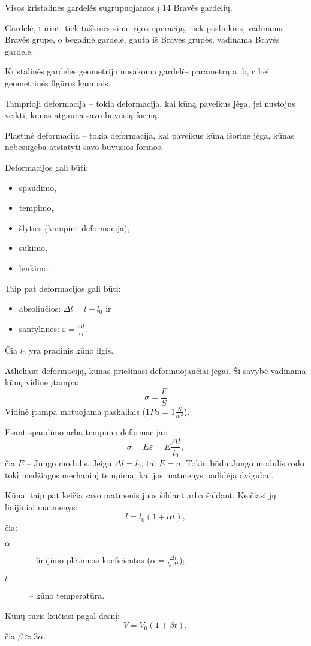 Visos kristalinės gardelės sugrupuojamos į 14 Bravės gardelių.

Gardelė, turinti tiek taškinės simetrijos operaciją, tiek poslinkius,
vadinama Bravės grupe, o begalinė gardelė, gauta iš Bravės grupės,
vadinama Bravės gardele.

Kristalinės gardelės geometrija nusakoma gardelės parametrų a, b, c
bei geometrinės figūros kampais.

Tamprioji deformacija – tokia deformacija, kai kūną paveikus jėga, jei
nustojus veikti, kūnas atgauna savo buvusią formą.

Plastinė deformacija – tokia deformacija, kai paveikus kūną išorine jėga,
kūnas nebesugeba atstatyti savo buvusios formos.

Deformacijos gali būti:
\begin{itemize}
  \item spaudimo,
  \item tempimo,
  \item šlyties (kampinė deformacija),
  \item sukimo,
  \item lenkimo.
\end{itemize}

Taip pat deformacijos gali būti:
\begin{itemize}
  \item absoliučios: $\Delta l = l - l_{0}$ ir
  \item santykinės: $\varepsilon = \frac{\Delta l}{l_{0}}$.
\end{itemize}
Čia $l_{0}$ yra pradinis kūno ilgis.

Atliekant deformaciją, kūnas priešinasi deformuojančiai jėgai. Ši
savybė vadinama kūnų vidine įtampa:
\begin{equation*}
  \sigma = \frac{F}{S}
\end{equation*}
Vidinė įtampa matuojama paskaliais ($1 Pa = 1 \frac{N}{m^{2}}$).

Esant spaudimo arba tempimo deformacijai:
\begin{equation*}
  \sigma = E \varepsilon = E \frac{\Delta l}{l_{0}},
\end{equation*}
čia $E$ – Jungo modulis. Jeigu $\Delta l = l_{0}$, tai $E = \sigma$.
Tokiu būdu Jungo modulis rodo tokį medžiagos mechaninį tempimą, kai
jos matmenys padidėja dvigubai.

Kūnai taip pat keičia savo matmenis juos šildant arba šaldant. Keičiasi
jų linijiniai matmenys:
\begin{equation*}
  l = l_{0}(1 + \alpha t),
\end{equation*}
čia:
\begin{description}
  \item[$\alpha$] – linijinio plėtimosi koeficientas
    ($\alpha = \frac{\Delta l}{l_{0} \Delta t}$);
  \item[$t$] – kūno temperatūra.
\end{description}
Kūnų tūris keičiasi pagal dėsnį:
\begin{equation*}
  V = V_{0}\left( 1 + \beta t \right),
\end{equation*}
čia $\beta \approx 3 \alpha$.

